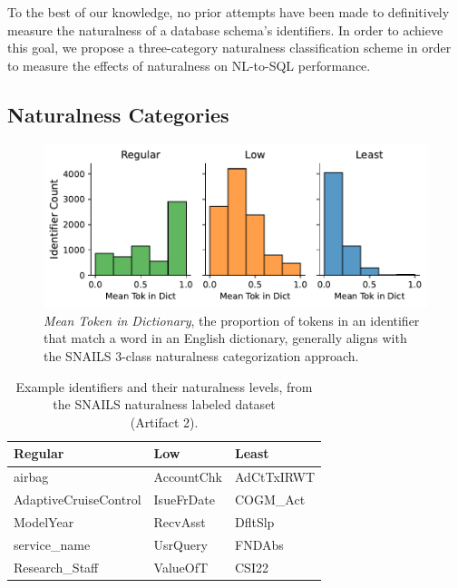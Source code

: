 To the best of our knowledge, no prior attempts have been made to definitively measure the naturalness of a database schema's identifiers.
In order to achieve this goal, we propose a three-category naturalness classification scheme in order to measure the effects of naturalness on NL-to-SQL performance.

\subsection{Naturalness Categories}
\label{section:naturalness-categories}

\begin{figure}
  \centering
  \includegraphics[width=\figwidthmod\linewidth]{figures/mean_token_in_dictionary.pdf}
  \caption{\emph{Mean Token in Dictionary}, the proportion of tokens in an identifier that match a word in an English dictionary, generally aligns with the SNAILS 3-class naturalness categorization approach.}
  \label{fig:meantokenindictionary}
\end{figure}

\begin{table}[t]
  \centering
  \begin{tabular}{|p{3.5cm}|p{2.1cm}|p{2.1cm}|}
  \hline
  \textbf{Regular} & \textbf{Low} & \textbf{Least}\\
  \hline
  airbag & AccountChk & AdCtTxIRWT \\
  AdaptiveCruiseControl & IsueFrDate & COGM\_Act \\
  ModelYear & RecvAsst & DfltSlp \\
  service\_name & UsrQuery & FNDAbs \\
  Research\_Staff & ValueOfT & CSI22 \\
  \hline
  \end{tabular}
  \caption{Example identifiers and their naturalness levels, from the SNAILS naturalness labeled dataset\\ (Artifact 2).}
  \label{table:nat-cat-examples}
\end{table}

